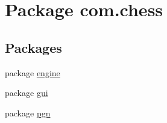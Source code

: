 \hypertarget{namespacecom_1_1chess}{}\section{Package com.\+chess}
\label{namespacecom_1_1chess}
\subsection*{Packages}
\begin{DoxyCompactItemize}
\item 
package \mbox{\hyperlink{namespacecom_1_1chess_1_1engine}{engine}}
\item 
package \mbox{\hyperlink{namespacecom_1_1chess_1_1gui}{gui}}
\item 
package \mbox{\hyperlink{namespacecom_1_1chess_1_1pgn}{pgn}}
\end{DoxyCompactItemize}
